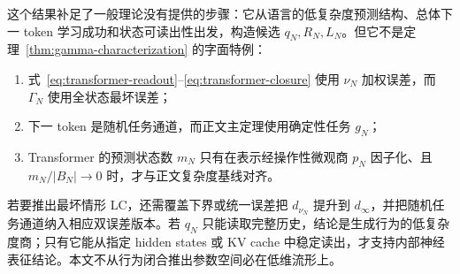 这个结果补足了一般理论没有提供的步骤：它从语言的低复杂度预测结构、总体下一 token 学习成功和状态可读出性出发，构造候选 $q_N,R_N,L_N$。但它不是定理~\ref{thm:gamma-characterization} 的字面特例：

\begin{enumerate}
  \item 式~\eqref{eq:transformer-readout}--\eqref{eq:transformer-closure} 使用 $\nu_N$ 加权误差，而 $\Gamma_N$ 使用全状态最坏误差；
  \item 下一 token 是随机任务通道，而正文主定理使用确定性任务 $g_N$；
  \item Transformer 的预测状态数 $m_N$ 只有在表示经操作性微观商 $p_N$ 因子化、且 $m_N/|B_N|\to0$ 时，才与正文复杂度基线对齐。
\end{enumerate}

若要推出最坏情形 LC，还需覆盖下界或统一误差把 $d_{\nu_N}$ 提升到 $d_\infty$，并把随机任务通道纳入相应双误差版本。若 $q_N$ 只能读取完整历史，结论是生成行为的低复杂度商；只有它能从指定 hidden states 或 KV cache 中稳定读出，才支持内部神经表征结论。本文不从行为闭合推出参数空间必在低维流形上。
